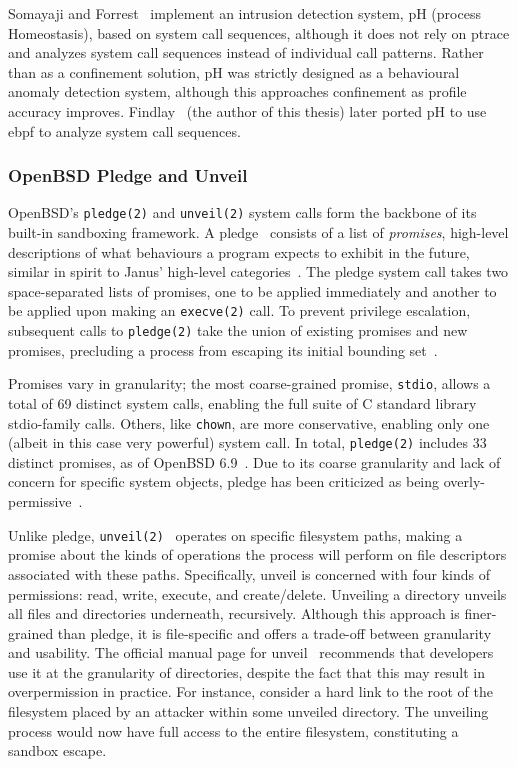 Somayaji and Forrest~\cite{somayaji2000_ph} implement an intrusion detection system, pH
(process Homeostasis), based on system call sequences, although it does not rely on ptrace
and analyzes system call sequences instead of individual call patterns. Rather than as
a confinement solution, pH was strictly designed as a behavioural anomaly detection
system, although this approaches confinement as profile accuracy improves.
Findlay~\cite{findlay2020_ebph} (the author of this thesis) later ported pH to use
\gls{ebpf} to analyze system call sequences.

\subsubsection*{OpenBSD Pledge and Unveil}
\label{sss:pledge}

OpenBSD's \texttt{pledge(2)} and \texttt{unveil(2)} system calls form the backbone of its
built-in sandboxing framework. A pledge~\cite{pledge} consists of a list of
\textit{promises}, high-level descriptions of what behaviours a program expects to exhibit
in the future, similar in spirit to Janus' high-level categories~\cite{goldberg96_janus,
wagner1999_janus}. The pledge system call takes two space-separated lists of promises, one
to be applied immediately and another to be applied upon making an \texttt{execve(2)}
call. To prevent privilege escalation, subsequent calls to \texttt{pledge(2)} take the
union of existing promises and new promises, precluding a process from escaping its
initial bounding set~\cite{pledge}.

Promises vary in granularity; the most coarse-grained promise, \texttt{stdio}, allows
a total of 69 distinct system calls, enabling the full suite of C standard library
stdio-family calls. Others, like \texttt{chown}, are more conservative, enabling only one
(albeit in this case very powerful) system call. In total, \texttt{pledge(2)} includes 33
distinct promises, as of OpenBSD 6.9~\cite{pledge}. Due to its coarse granularity and lack
of concern for specific system objects, pledge has been criticized as being
overly-permissive~\cite{anderson2017_comparison}.

Unlike pledge, \texttt{unveil(2)}~\cite{unveil, corbet2018_unveil} operates on specific
filesystem paths, making a promise about the kinds of operations the process will perform
on file descriptors associated with these paths. Specifically, unveil is concerned with
four kinds of permissions: read, write, execute, and create/delete. Unveiling a directory
unveils all files and directories underneath, recursively. Although this approach is
finer-grained than pledge, it is file-specific and offers a trade-off between granularity
and usability. The official manual page for unveil~\cite{unveil} recommends that
developers use it at the granularity of directories, despite the fact that this may result
in overpermission in practice. For instance, consider a hard link to the root of the
filesystem placed by an attacker within some unveiled directory. The unveiling process
would now have full access to the entire filesystem, constituting a sandbox escape.

